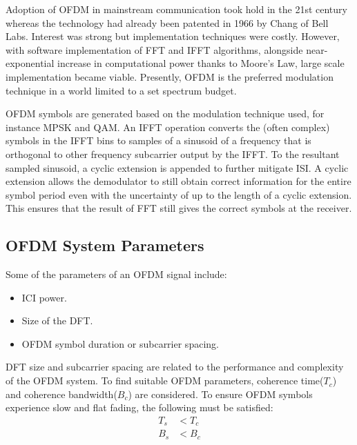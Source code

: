 Adoption of \gls{OFDM} in mainstream communication took hold in the 21st century whereas the technology had already been patented in 1966 by Chang of Bell Labs\cite{history_ofdm}. Interest was strong but implementation techniques were costly. However, with software implementation of \gls{FFT} and \gls{IFFT} algorithms, alongside near-exponential increase in computational power thanks to Moore's Law, large scale implementation became viable. Presently, \gls{OFDM} is the preferred modulation technique in a world limited to a set spectrum budget.

\gls{OFDM} \gls{symbol}s are generated based on the modulation technique used, for instance \gls{MPSK} and \gls{QAM}. An \gls{IFFT} operation converts the (often complex) symbols in the \gls{IFFT} bins to samples of a sinusoid of a frequency that is orthogonal to other frequency \gls{subcarrier} output by the \gls{IFFT}. To the resultant sampled sinusoid, a cyclic extension is appended to further mitigate \gls{ISI}. A cyclic extension allows the demodulator to still obtain correct information for the entire symbol period even with the uncertainty of up to the length of a cyclic extension. This ensures that the result of \gls{FFT} still gives the correct symbols at the receiver.

\subsection{\gls{OFDM} System Parameters}
Some of the parameters of an \gls{OFDM} signal include:
\begin{itemize}
	\item \gls{ICI} power.
	\item Size of the \gls{DFT}.
	\item \gls{OFDM} symbol duration or \gls{subcarrier} spacing.
\end{itemize}
\gls{DFT} size and \gls{subcarrier} spacing are related to the performance and complexity of the \gls{OFDM} system\cite{wireless_design}. To find suitable \gls{OFDM} parameters, coherence time($T_c$) and coherence bandwidth($B_c$) are considered. To ensure \gls{OFDM} symbols experience slow and flat fading, the following must be satisfied:
\begin{align*}
T_s &< T_c\\
B_s &< B_c
\end{align*}

